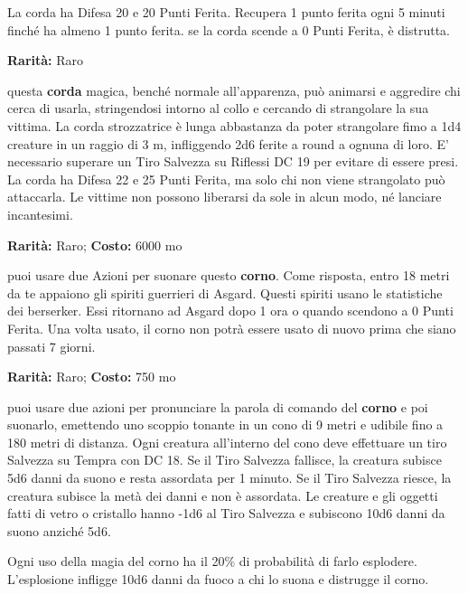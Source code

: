 \begin{multicols}{2}
La corda ha Difesa 20 e 20 Punti Ferita. Recupera 1 punto ferita ogni 5 minuti finché ha almeno 1 punto ferita. se la corda scende a 0 Punti Ferita, è distrutta.


\textbf{Rarità:} Raro

questa \textbf{corda} magica, benché normale all'apparenza, può animarsi e aggredire chi cerca di usarla, stringendosi intorno al collo e cercando di strangolare la sua vittima. La corda strozzatrice è lunga abbastanza da poter strangolare fimo a 1d4 creature in un raggio di 3 m, infliggendo 2d6 ferite a round a ognuna di loro. E' necessario superare un Tiro Salvezza su Riflessi DC 19 per evitare di essere presi. La corda ha Difesa 22 e 25 Punti Ferita, ma solo chi non viene strangolato può attaccarla. Le vittime non possono liberarsi da sole in alcun modo, né lanciare incantesimi.


\textbf{Rarità:} Raro; \textbf{Costo:} 6000 mo

puoi usare due Azioni per suonare questo \textbf{corno}. Come risposta, entro 18 metri da te appaiono gli spiriti guerrieri di Asgard. Questi spiriti usano le statistiche dei berserker. Essi ritornano ad Asgard dopo 1 ora o quando scendono a 0 Punti Ferita. Una volta usato, il corno non potrà essere usato di nuovo prima che siano passati 7 giorni.




\textbf{Rarità:} Raro; \textbf{Costo:} 750 mo

puoi usare due azioni per pronunciare la parola di comando del \textbf{corno} e poi suonarlo, emettendo uno scoppio tonante in un cono di 9 metri e udibile fino a 180 metri di distanza. Ogni creatura all'interno del cono deve effettuare un tiro Salvezza su Tempra con DC 18. Se il Tiro Salvezza fallisce, la creatura subisce 5d6 danni da suono e resta assordata per 1 minuto. Se il Tiro Salvezza riesce, la creatura subisce la metà dei danni e non è assordata. Le creature e gli oggetti fatti di vetro o cristallo hanno -1d6 al Tiro Salvezza e subiscono 10d6 danni da suono anziché 5d6.

Ogni uso della magia del corno ha il 20\% di probabilità di farlo esplodere. L'esplosione infligge 10d6 danni da fuoco a chi lo suona e distrugge il corno.


\end{multicols}
